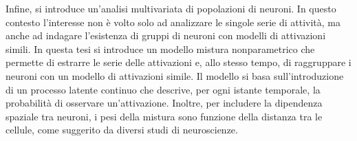 Infine, si introduce un'analisi multivariata di popolazioni di neuroni. In questo contesto l'interesse non è volto solo ad analizzare le singole serie di attività, ma anche ad indagare l'esistenza di gruppi di neuroni con modelli di attivazioni simili.  
In questa tesi si introduce un modello mistura nonparametrico che permette di estrarre le serie delle attivazioni e, allo stesso tempo, di raggruppare i neuroni con un modello di attivazioni simile.
Il modello si basa sull'introduzione di un processo latente continuo che descrive, per ogni istante temporale, la probabilità di osservare un'attivazione. Inoltre, per includere la dipendenza spaziale tra neuroni, i pesi della mistura sono funzione della distanza tra le cellule, come suggerito da diversi studi di neuroscienze.
